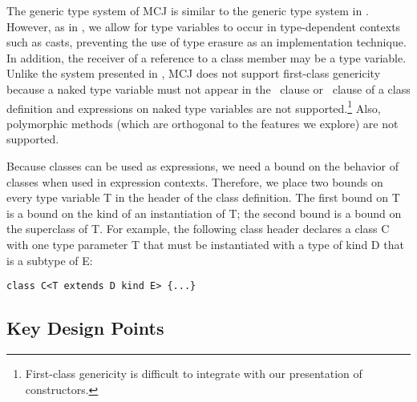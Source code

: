 \documentclass{acm-sigplan}
\begin{document}




The generic type system of MCJ is similar to the generic type system
in \FGJ. However, as in \cite{NextGen, DimUnits}, we allow for type
variables to occur in type-dependent contexts such as casts,
preventing the use of type erasure as an implementation technique. In
addition, the receiver of a reference to a class member may be a type
variable. Unlike the system presented in \cite{MixGen}, MCJ does not
support first-class genericity because a naked type variable must not
appear in the \extends\ clause or \kind\ clause of a class definition
and {} expressions on naked type variables are not
supported.\footnote{First-class genericity is difficult to integrate
with our presentation of constructors.} Also, polymorphic methods
(which are orthogonal to the features we explore) are not supported.

Because classes can be used as expressions, we need a bound on the
behavior of classes when used in expression contexts.  Therefore, we
place two bounds on every type variable {\txt T} in the header of the
class definition. The first bound on {\txt T} is a bound on the kind
of an instantiation of {\txt T}; the second bound is a bound on the
superclass of {\txt T}. For example, the following class header
declares a class {\txt C} with one type parameter {\txt T} that must
be instantiated with a type of kind {\txt D} that is a subtype of
{\txt E}:

\begin{verbatim}
class C<T extends D kind E> {...}
\end{verbatim}


\subsection{Key Design Points}
\end{document}
